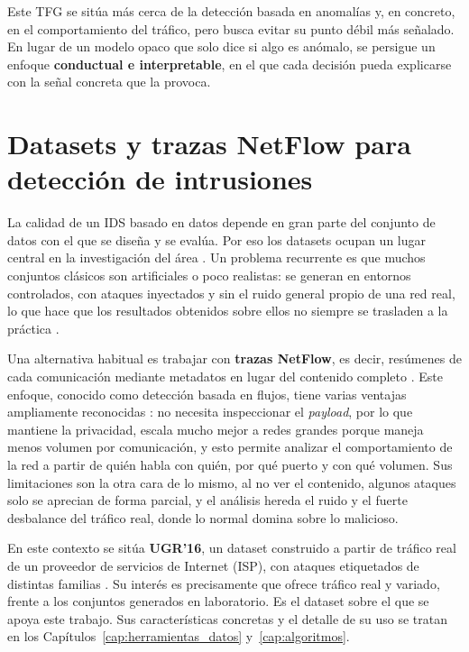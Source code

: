 Este TFG se sitúa más cerca de la detección basada en anomalías y, en concreto, en el comportamiento del tráfico, pero busca evitar su punto débil más señalado. En lugar de un modelo opaco que solo dice si algo es anómalo, se persigue un enfoque \textbf{conductual e interpretable}, en el que cada decisión pueda explicarse con la señal concreta que la provoca.

\section{Datasets y trazas NetFlow para detección de intrusiones}
\label{sec:arte_datasets}

La calidad de un IDS basado en datos depende en gran parte del conjunto de datos con el que se diseña y se evalúa. Por eso los datasets ocupan un lugar central en la investigación del área \cite{ring2019survey}. Un problema recurrente es que muchos conjuntos clásicos son artificiales o poco realistas: se generan en entornos controlados, con ataques inyectados y sin el ruido general propio de una red real, lo que hace que los resultados obtenidos sobre ellos no siempre se trasladen a la práctica \cite{ring2019survey}.

Una alternativa habitual es trabajar con \textbf{trazas NetFlow}, es decir, resúmenes de cada comunicación mediante metadatos en lugar del contenido completo \cite{rfc3954}. Este enfoque, conocido como detección basada en flujos, tiene varias ventajas ampliamente reconocidas \cite{sperotto2010overview}: no necesita inspeccionar el \emph{payload}, por lo que mantiene la privacidad, escala mucho mejor a redes grandes porque maneja menos volumen por comunicación, y esto permite analizar el comportamiento de la red a partir de quién habla con quién, por qué puerto y con qué volumen. Sus limitaciones son la otra cara de lo mismo, al no ver el contenido, algunos ataques solo se aprecian de forma parcial, y el análisis hereda el ruido y el fuerte desbalance del tráfico real, donde lo normal domina sobre lo malicioso.

En este contexto se sitúa \textbf{UGR'16}, un dataset construido a partir de tráfico real de un proveedor de servicios de Internet (ISP), con ataques etiquetados de distintas familias \cite{ugr16}. Su interés es precisamente que ofrece tráfico real y variado, frente a los conjuntos generados en laboratorio. Es el dataset sobre el que se apoya este trabajo. Sus características concretas y el detalle de su uso se tratan en los Capítulos~\ref{cap:herramientas_datos} y~\ref{cap:algoritmos}.

